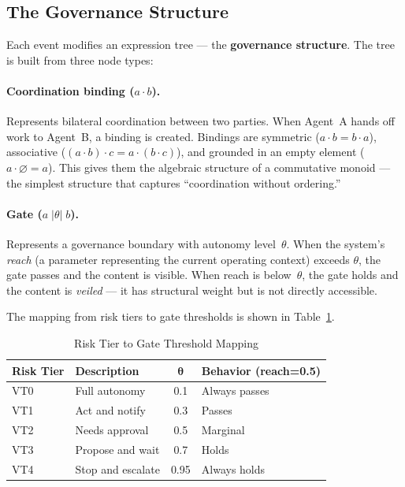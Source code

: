 \documentclass[sigconf,nonacm]{acmart}
\begin{document}
\subsection{The Governance Structure}

Each event modifies an expression tree --- the \textbf{governance structure}.
The tree is built from three node types:

\paragraph{Coordination binding ($a \cdot b$).}
Represents bilateral coordination between two parties. When Agent~A hands
off work to Agent~B, a binding is created. Bindings are symmetric
($a \cdot b = b \cdot a$), associative ($(a \cdot b) \cdot c = a \cdot
(b \cdot c)$), and grounded in an empty element ($a \cdot \varnothing = a$).
This gives them the algebraic structure of a commutative monoid --- the
simplest structure that captures ``coordination without ordering.''

\paragraph{Gate ($a\;|\theta|\;b$).}
Represents a governance boundary with autonomy level~$\theta$. When the
system's \emph{reach} (a parameter representing the current operating
context) exceeds $\theta$, the gate passes and the content is visible.
When reach is below~$\theta$, the gate holds and the content is
\emph{veiled} --- it has structural weight but is not directly accessible.

The mapping from risk tiers to gate thresholds is shown in
Table~\ref{tab:risktiers}.

\begin{table}[t]
  \caption{Risk Tier to Gate Threshold Mapping}\label{tab:risktiers}
  \small
  \begin{tabular}{@{}llcl@{}}
    \toprule
    \textbf{Risk Tier} & \textbf{Description} & $\boldsymbol{\theta}$ & \textbf{Behavior (reach=0.5)} \\
    \midrule
    VT0 & Full autonomy & 0.1 & Always passes \\
    VT1 & Act and notify & 0.3 & Passes \\
    VT2 & Needs approval & 0.5 & Marginal \\
    VT3 & Propose and wait & 0.7 & Holds \\
    VT4 & Stop and escalate & 0.95 & Always holds \\
    \bottomrule
  \end{tabular}
\end{table}
\end{document}
